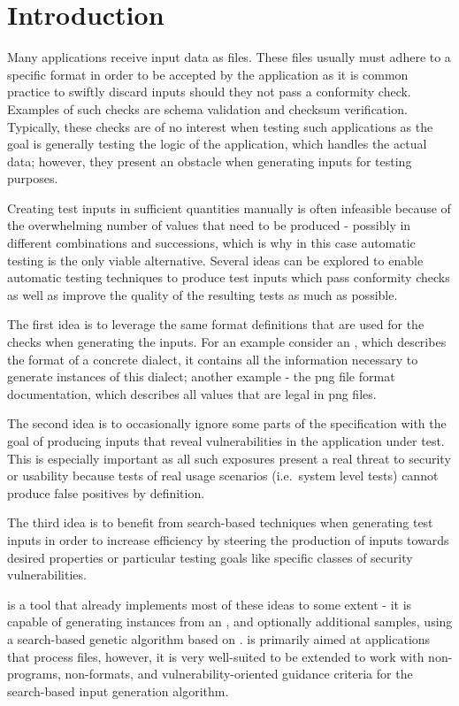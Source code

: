 \section{Introduction}
Many applications receive input data as files. These files usually must adhere to a specific format in order
to be accepted by the application as it is common practice to swiftly discard inputs should they not pass a
conformity check. Examples of such checks are schema validation and checksum verification. Typically, these
checks are of no interest when testing such applications as the goal is generally testing the logic of the
application, which handles the actual data; however, they present an obstacle when generating inputs for
testing purposes.

Creating test inputs in sufficient quantities manually is often infeasible because of the overwhelming number
of values that need to be produced - possibly in different combinations and successions, which is why in this
case automatic testing is the only viable alternative. Several ideas can be explored to enable automatic
testing techniques to produce test inputs which pass conformity checks as well as improve the quality of the
resulting tests as much as possible.

The first idea is to leverage the same format definitions that are used for the checks when generating the
inputs. For an example consider an \xsd, which describes the format of a concrete \xml dialect, it contains all
the information necessary to generate instances of this dialect; another example - the png file format
documentation, which describes all values that are legal in png files.

The second idea is to occasionally ignore some parts of the specification with the goal of producing inputs
that reveal vulnerabilities in the application under test. This is especially important as all such exposures
present a real threat to security or usability because tests of real usage scenarios (i.e.\ system level tests)
cannot produce false positives by definition.

The third idea is to benefit from search-based techniques when generating test inputs in order to increase
efficiency by steering the production of inputs towards desired properties or particular testing goals like
specific classes of security vulnerabilities.

\xmlmate{}\cite{Havrikov:2014:XEX:2635868.2661666} is a tool that already implements most of these ideas to
some extent - it is capable of generating \xml instances from an \xsd{}, and optionally additional \xml
samples, using a search-based genetic algorithm based on \evosuite{}\cite{fraser2013whole}. \xmlmate is
primarily aimed at \java applications that process \xml files, however, it is very well-suited to be extended
to work with non-\java programs, non-\xml formats, and vulnerability-oriented guidance criteria for the
search-based input generation algorithm.

